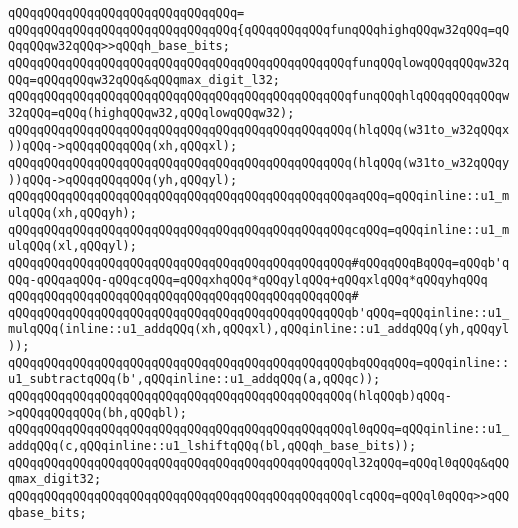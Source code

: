 \verb|qQQqqQQqqQQqqQQqqQQqqQQqqQQqqQQq=|\newline
\verb|qQQqqQQqqQQqqQQqqQQqqQQqqQQqqQQq{qQQqqQQqqQQqfunqQQqhighqQQqw32qQQq=qQQqqQQqw32qQQq>>qQQqh_base_bits;|\newline
\verb|qQQqqQQqqQQqqQQqqQQqqQQqqQQqqQQqqQQqqQQqqQQqqQQqfunqQQqlowqQQqqQQqw32qQQq=qQQqqQQqw32qQQq&qQQqmax_digit_l32;|\newline
\verb|qQQqqQQqqQQqqQQqqQQqqQQqqQQqqQQqqQQqqQQqqQQqqQQqfunqQQqhlqQQqqQQqqQQqw32qQQq=qQQq(highqQQqw32,qQQqlowqQQqw32);|\newline
\newline
\verb|qQQqqQQqqQQqqQQqqQQqqQQqqQQqqQQqqQQqqQQqqQQqqQQq(hlqQQq(w31to_w32qQQqx))qQQq->qQQqqQQqqQQq(xh,qQQqxl);|\newline
\verb|qQQqqQQqqQQqqQQqqQQqqQQqqQQqqQQqqQQqqQQqqQQqqQQq(hlqQQq(w31to_w32qQQqy))qQQq->qQQqqQQqqQQq(yh,qQQqyl);|\newline
\newline
\verb|qQQqqQQqqQQqqQQqqQQqqQQqqQQqqQQqqQQqqQQqqQQqqQQqaqQQq=qQQqinline::u1_mulqQQq(xh,qQQqyh);|\newline
\verb|qQQqqQQqqQQqqQQqqQQqqQQqqQQqqQQqqQQqqQQqqQQqqQQqcqQQq=qQQqinline::u1_mulqQQq(xl,qQQqyl);|\newline
\newline
\verb|qQQqqQQqqQQqqQQqqQQqqQQqqQQqqQQqqQQqqQQqqQQqqQQq#qQQqqQQqBqQQq=qQQqb'qQQq-qQQqaqQQq-qQQqcqQQq=qQQqxhqQQq*qQQqylqQQq+qQQqxlqQQq*qQQqyhqQQq|\newline
\verb|qQQqqQQqqQQqqQQqqQQqqQQqqQQqqQQqqQQqqQQqqQQqqQQq#|\newline
\verb|qQQqqQQqqQQqqQQqqQQqqQQqqQQqqQQqqQQqqQQqqQQqqQQqb'qQQq=qQQqinline::u1_mulqQQq(inline::u1_addqQQq(xh,qQQqxl),qQQqinline::u1_addqQQq(yh,qQQqyl));|\newline
\verb|qQQqqQQqqQQqqQQqqQQqqQQqqQQqqQQqqQQqqQQqqQQqqQQqbqQQqqQQq=qQQqinline::u1_subtractqQQq(b',qQQqinline::u1_addqQQq(a,qQQqc));|\newline
\newline
\verb|qQQqqQQqqQQqqQQqqQQqqQQqqQQqqQQqqQQqqQQqqQQqqQQq(hlqQQqb)qQQq->qQQqqQQqqQQq(bh,qQQqbl);|\newline
\newline
\verb|qQQqqQQqqQQqqQQqqQQqqQQqqQQqqQQqqQQqqQQqqQQqqQQql0qQQq=qQQqinline::u1_addqQQq(c,qQQqinline::u1_lshiftqQQq(bl,qQQqh_base_bits));|\newline
\verb|qQQqqQQqqQQqqQQqqQQqqQQqqQQqqQQqqQQqqQQqqQQqqQQql32qQQq=qQQql0qQQq&qQQqmax_digit32;|\newline
\verb|qQQqqQQqqQQqqQQqqQQqqQQqqQQqqQQqqQQqqQQqqQQqqQQqlcqQQq=qQQql0qQQq>>qQQqbase_bits;|\newline
